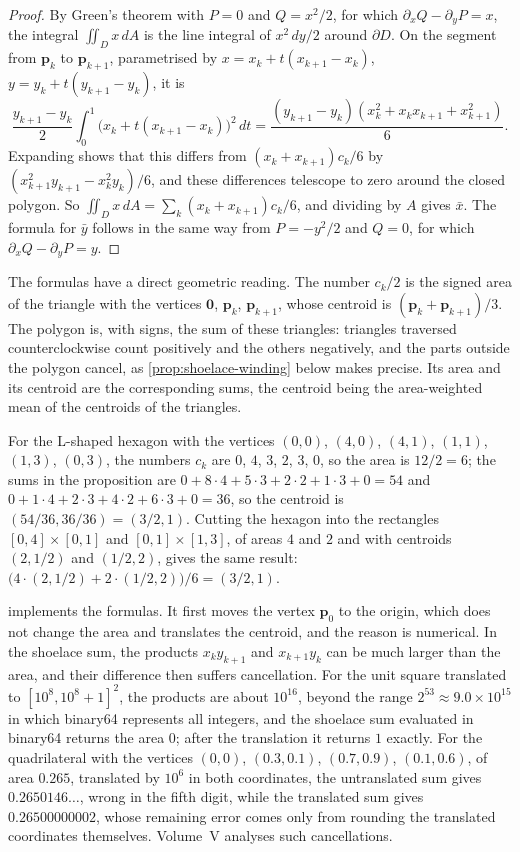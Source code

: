\begin{proof}
By Green's theorem with $P=0$ and $Q=x^2/2$, for which $\partial_xQ-\partial_yP=x$, the integral $\iint_Dx\,dA$ is the line integral of $x^2\,dy/2$ around $\partial D$. On the segment from $\mathbf p_k$ to $\mathbf p_{k+1}$, parametrised by $x=x_k+t(x_{k+1}-x_k)$, $y=y_k+t(y_{k+1}-y_k)$, it is
\[
\frac{y_{k+1}-y_k}2\int_0^1\bigl(x_k+t(x_{k+1}-x_k)\bigr)^2\,dt=\frac{(y_{k+1}-y_k)(x_k^2+x_kx_{k+1}+x_{k+1}^2)}6 .
\]
Expanding shows that this differs from $(x_k+x_{k+1})c_k/6$ by $(x_{k+1}^2y_{k+1}-x_k^2y_k)/6$, and these differences telescope to zero around the closed polygon. So $\iint_Dx\,dA=\sum_k(x_k+x_{k+1})c_k/6$, and dividing by $A$ gives $\bar x$. The formula for $\bar y$ follows in the same way from $P=-y^2/2$ and $Q=0$, for which $\partial_xQ-\partial_yP=y$.
\end{proof}

The formulas have a direct geometric reading. The number $c_k/2$ is the signed area of the triangle with the vertices $\mathbf0$, $\mathbf p_k$, $\mathbf p_{k+1}$, whose centroid is $(\mathbf p_k+\mathbf p_{k+1})/3$. The polygon is, with signs, the sum of these triangles: triangles traversed counterclockwise count positively and the others negatively, and the parts outside the polygon cancel, as \cref{prop:shoelace-winding} below makes precise. Its area and its centroid are the corresponding sums, the centroid being the area-weighted mean of the centroids of the triangles.

For the L-shaped hexagon with the vertices $(0,0)$, $(4,0)$, $(4,1)$, $(1,1)$, $(1,3)$, $(0,3)$, the numbers $c_k$ are $0$, $4$, $3$, $2$, $3$, $0$, so the area is $12/2=6$; the sums in the proposition are $0+8\cdot4+5\cdot3+2\cdot2+1\cdot3+0=54$ and $0+1\cdot4+2\cdot3+4\cdot2+6\cdot3+0=36$, so the centroid is $(54/36,36/36)=(3/2,1)$. Cutting the hexagon into the rectangles $[0,4]\times[0,1]$ and $[0,1]\times[1,3]$, of areas $4$ and $2$ and with centroids $(2,1/2)$ and $(1/2,2)$, gives the same result: $\bigl(4\cdot(2,1/2)+2\cdot(1/2,2)\bigr)/6=(3/2,1)$.

 implements the formulas. It first moves the vertex $\mathbf p_0$ to the origin, which does not change the area and translates the centroid, and the reason is numerical. In the shoelace sum, the products $x_ky_{k+1}$ and $x_{k+1}y_k$ can be much larger than the area, and their difference then suffers cancellation. For the unit square translated to $[10^8,10^8+1]^2$, the products are about $10^{16}$, beyond the range $2^{53}\approx9.0\times10^{15}$ in which binary64 represents all integers, and the shoelace sum evaluated in binary64 returns the area $0$; after the translation it returns $1$ exactly. For the quadrilateral with the vertices $(0,0)$, $(0.3,0.1)$, $(0.7,0.9)$, $(0.1,0.6)$, of area $0.265$, translated by $10^6$ in both coordinates, the untranslated sum gives $0.2650146\ldots$, wrong in the fifth digit, while the translated sum gives $0.26500000002$, whose remaining error comes only from rounding the translated coordinates themselves. Volume~V analyses such cancellations.

